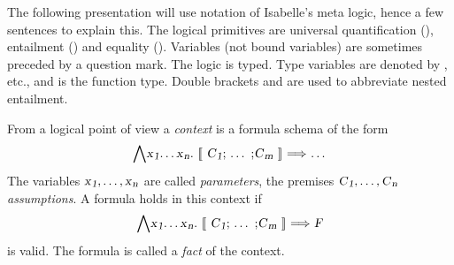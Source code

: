 \begin{isabellebody}
\begin{isamarkuptext}
  The following presentation will use notation of
  Isabelle's meta logic, hence a few sentences to explain this.
  The logical
  primitives are universal quantification (\isa{{\isasymAnd}}), entailment
  (\isa{{\isasymLongrightarrow}}) and equality (\isa{{\isasymequiv}}).  Variables (not bound
  variables) are sometimes preceded by a question mark.  The logic is
  typed.  Type variables are denoted by , 
  etc., and \isa{{\isasymRightarrow}} is the function type.  Double brackets \isa{{\isasymlbrakk}} and \isa{{\isasymrbrakk}} are used to abbreviate nested entailment.%
\end{isamarkuptext}%
\isamarkuptrue%
%
\isamarkuptrue%
%
\begin{isamarkuptext}%
From a logical point of view a \emph{context} is a formula schema of
  the form
\[
  \isa{{\isasymAnd}x\isactrlsub {\isadigit{1}}{\isasymdots}x\isactrlsub n{\isachardot}\ {\isasymlbrakk}\ C\isactrlsub {\isadigit{1}}{\isacharsemicolon}\ {\isasymdots}\ {\isacharsemicolon}C\isactrlsub m\ {\isasymrbrakk}\ {\isasymLongrightarrow}\ {\isasymdots}}
\]
  The variables $\emph{\sl x\emph{${}\sb{\mbox{\footnotesize\sl{1}}}$}}, \ldots, \emph{\sl x\emph{${}\sb{\mbox{\footnotesize\sl{n}}}$}}$ are
  called \emph{parameters}, the premises $\emph{\sl C\emph{${}\sb{\mbox{\footnotesize\sl{1}}}$}}, \ldots,
  \emph{\sl C\emph{${}\sb{\mbox{\footnotesize\sl{n}}}$}}$ \emph{assumptions}.  A formula 
  holds in this context if
\begin{equation}
\label{eq-fact-in-context}
  \isa{{\isasymAnd}x\isactrlsub {\isadigit{1}}{\isasymdots}x\isactrlsub n{\isachardot}\ {\isasymlbrakk}\ C\isactrlsub {\isadigit{1}}{\isacharsemicolon}\ {\isasymdots}\ {\isacharsemicolon}C\isactrlsub m\ {\isasymrbrakk}\ {\isasymLongrightarrow}\ F}
\end{equation}
  is valid.  The formula is called a \emph{fact} of the context.


\end{isamarkuptext}
\end{isabellebody}
